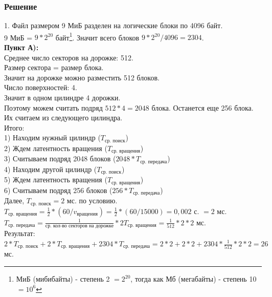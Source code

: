 \documentclass[12pt, letterpaper]{article}
\begin{document}
\subsubsection{Решение}
1. Файл размером 9 МиБ разделен на логические блоки по 4096 байт.\\
9 МиБ = $9*2^{20}$ байт\footnote{МиБ (мибибайты) - степень 2 $= 2^{20}$, тогда как Мб (мегабайты) - степень 10 $= 10^6$}. Значит всего блоков $9*2^{20}/4096=2304$.\\

\textbf{Пункт А):}\\
Среднее число секторов на дорожке: 512.\\
Размер сектора = размер блока.\\
Значит на дорожке можно разместить 512 блоков.\\
Число поверхностей: 4.\\
Значит в одном цилиндре 4 дорожки.\\
Поэтому можем считать подряд $512 * 4 = 2048$ блока. Останется еще 256 блока. Их считаем из следующего цилиндра.\\

Итого:\\
1) Находим нужный цилиндр ($T_\text{ср. поиск}$)\\
2) Ждем латентность вращения ($T_\text{ср. вращения}$)\\
3) Считываем подряд 2048 блоков ($2048 * T_\text{ср. передача}$)\\
4) Находим другой цилиндр  ($T_\text{ср. поиск}$)\\
5) Ждем латентность вращения ($T_\text{ср. вращения}$)\\
6) Считываем подряд 256 блоков ($256 * T_\text{ср. передача}$)\\

Далее, $T_\text{ср. поиск} = 2$ мс. по условию.\\
$T_\text{ср. вращения}=\frac{1}{2} * (60/v_\text{вращения}) = \frac{1}{2} * (60/15000) = 0,002$ с. $= 2$ мс.\\

$T_\text{ср. передача} = \frac{1}{\text{ср. кол-во секторов на дорожке}} * 2T_\text{ср. вращения} = \frac{1}{512} * 2 * 2$ мс.\\

Результат: $2 * T_\text{ср. поиск} + 2 * T_\text{ср. вращения} + 2304 * T_\text{ср. передача} = 2 * 2 + 2 * 2 + 2304 * \frac{1}{512} * 2 * 2 = 26$ мс.\\
\end{document}
